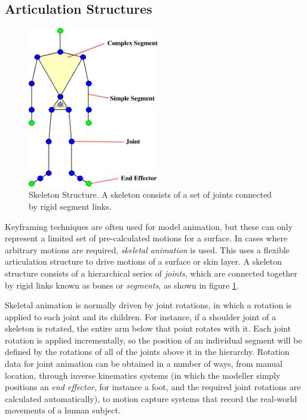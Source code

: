 \subsection{\label{sec:litreview:animation:skeleton}Articulation Structures}
\begin{figure}
\begin{center}
\includegraphics[height=7cm]{../images/skeleton_nosites}
\caption[Skeleton Structure]{\label{fig:skeleton} Skeleton Structure. A skeleton consists of a set of joints connected by rigid segment links.}
\end{center}
\end{figure}
Keyframing techniques are often used for model animation, but these can only represent a limited set of pre-calculated motions for a surface. In cases where arbitrary motions are required, {\it skeletal animation} is used. This uses a flexible articulation structure to drive motions of a surface or skin layer. A skeleton structure consists of a hierarchical series of {\it joints}, which are connected together by rigid links known as bones or {\it segments}, as shown in figure \ref{fig:skeleton}.

Skeletal animation is normally driven by joint rotations, in which a rotation is applied to each joint and its children. For instance, if a shoulder joint of a skeleton is rotated, the entire arm below that point rotates with it. Each joint rotation is applied incrementally, so the position of an individual segment will be defined by the rotations of all of the joints above it in the hierarchy. Rotation data for joint animation can be obtained in a number of ways, from manual location, through inverse kinematics systems (in which the modeller simply positions an {\it end effector}, for instance a foot, and the required joint rotations are calculated automatically), to motion capture systems that record the real-world movements of a human subject.


